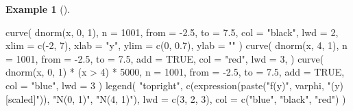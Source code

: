 \documentclass[
  letterpaper,
  DIV=11,
  numbers=noendperiod]{scrreprt}
\newenvironment{Shaded}{\begin{snugshade}}{\end{snugshade}}
\newcommand{\AttributeTok}[1]{\textcolor[rgb]{0.40,0.45,0.13}{#1}}
\newcommand{\ConstantTok}[1]{\textcolor[rgb]{0.56,0.35,0.01}{#1}}
\newcommand{\DecValTok}[1]{\textcolor[rgb]{0.68,0.00,0.00}{#1}}
\newcommand{\FloatTok}[1]{\textcolor[rgb]{0.68,0.00,0.00}{#1}}
\newcommand{\FunctionTok}[1]{\textcolor[rgb]{0.28,0.35,0.67}{#1}}
\newcommand{\NormalTok}[1]{\textcolor[rgb]{0.00,0.23,0.31}{#1}}
\newcommand{\SpecialCharTok}[1]{\textcolor[rgb]{0.37,0.37,0.37}{#1}}
\newcommand{\StringTok}[1]{\textcolor[rgb]{0.13,0.47,0.30}{#1}}
\theoremstyle{plain}
\theoremstyle{definition}
\theoremstyle{definition}
\newtheorem{example}{Example}[chapter]
\theoremstyle{remark}
\begin{document}
\begin{example}[]
\begin{Shaded}
\begin{Highlighting}[]
\FunctionTok{curve}\NormalTok{(}
  \FunctionTok{dnorm}\NormalTok{(x, }\DecValTok{0}\NormalTok{, }\DecValTok{1}\NormalTok{), }\AttributeTok{n =} \DecValTok{1001}\NormalTok{, }\AttributeTok{from =} \SpecialCharTok{{-}}\FloatTok{2.5}\NormalTok{, }\AttributeTok{to =} \FloatTok{7.5}\NormalTok{,}
  \AttributeTok{col =} \StringTok{"black"}\NormalTok{, }\AttributeTok{lwd =} \DecValTok{2}\NormalTok{,}
  \AttributeTok{xlim =} \FunctionTok{c}\NormalTok{(}\SpecialCharTok{{-}}\DecValTok{2}\NormalTok{, }\DecValTok{7}\NormalTok{), }\AttributeTok{xlab =} \StringTok{"y"}\NormalTok{, }\AttributeTok{ylim =} \FunctionTok{c}\NormalTok{(}\DecValTok{0}\NormalTok{, }\FloatTok{0.7}\NormalTok{), }\AttributeTok{ylab =} \StringTok{""}
\NormalTok{)}
\FunctionTok{curve}\NormalTok{(}
  \FunctionTok{dnorm}\NormalTok{(x, }\DecValTok{4}\NormalTok{, }\DecValTok{1}\NormalTok{), }\AttributeTok{n =} \DecValTok{1001}\NormalTok{, }\AttributeTok{from =} \SpecialCharTok{{-}}\FloatTok{2.5}\NormalTok{, }\AttributeTok{to =} \FloatTok{7.5}\NormalTok{,}
  \AttributeTok{add =} \ConstantTok{TRUE}\NormalTok{, }\AttributeTok{col =} \StringTok{"red"}\NormalTok{, }\AttributeTok{lwd =} \DecValTok{3}\NormalTok{,}
\NormalTok{)}
\FunctionTok{curve}\NormalTok{(}
  \FunctionTok{dnorm}\NormalTok{(x, }\DecValTok{0}\NormalTok{, }\DecValTok{1}\NormalTok{) }\SpecialCharTok{*}\NormalTok{ (x }\SpecialCharTok{\textgreater{}} \DecValTok{4}\NormalTok{) }\SpecialCharTok{*} \DecValTok{5000}\NormalTok{, }\AttributeTok{n =} \DecValTok{1001}\NormalTok{, }\AttributeTok{from =} \SpecialCharTok{{-}}\FloatTok{2.5}\NormalTok{, }\AttributeTok{to =} \FloatTok{7.5}\NormalTok{,}
  \AttributeTok{add =} \ConstantTok{TRUE}\NormalTok{, }\AttributeTok{col =} \StringTok{"blue"}\NormalTok{, }\AttributeTok{lwd =} \DecValTok{3}
\NormalTok{)}
\FunctionTok{legend}\NormalTok{(}
  \StringTok{"topright"}\NormalTok{,}
  \FunctionTok{c}\NormalTok{(}\FunctionTok{expression}\NormalTok{(}\FunctionTok{paste}\NormalTok{(}\StringTok{"f(y)"}\NormalTok{, varphi, }\StringTok{"(y) [scaled]"}\NormalTok{)), }\StringTok{"N(0, 1)"}\NormalTok{, }\StringTok{"N(4, 1)"}\NormalTok{),}
  \AttributeTok{lwd =} \FunctionTok{c}\NormalTok{(}\DecValTok{3}\NormalTok{, }\DecValTok{2}\NormalTok{, }\DecValTok{3}\NormalTok{), }\AttributeTok{col =} \FunctionTok{c}\NormalTok{(}\StringTok{"blue"}\NormalTok{, }\StringTok{"black"}\NormalTok{, }\StringTok{"red"}\NormalTok{)}
\NormalTok{)}
\end{Highlighting}
\end{Shaded}


\end{example}
\end{document}
